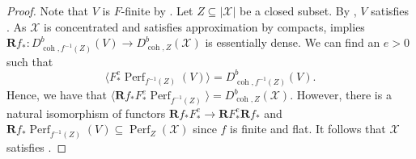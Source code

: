 \documentclass[10pt,a4paper]{amsart}
\begin{document}
\begin{proof}
    Note that $V$ is $F$-finite by . Let $Z\subseteq |\mathcal{X}|$ be a closed subset. 
    By , $V$ satisfies . 
    As $\mathcal{X}$ is concentrated and satisfies approximation by compacts,  implies $\mathbf{R} f_\ast \colon D^b_{\operatorname{coh},f^{-1}(Z)}(V) \to D^b_{\operatorname{coh},Z}(\mathcal{X})$ is essentially dense. 
    We can find an $e>0$ such that 
    \begin{displaymath}
        \langle F_\ast^e \operatorname{Perf}_{f^{-1} (Z)} (V) \rangle = D^b_{\operatorname{coh},f^{-1}(Z)}(V).
    \end{displaymath}
    Hence, we have that $\langle \mathbf{R} f_\ast F_\ast^e \operatorname{Perf}_{f^{-1} (Z)} \rangle = D_{\operatorname{coh},Z}^b(\mathcal{X})$. 
    However, there is a natural isomorphism of functors $\mathbf{R} f_\ast F_\ast^e \to \mathbf{R} F_\ast^e \mathbf{R} f_\ast$ and $\mathbf{R}f_\ast\operatorname{Perf}_{f^{-1} (Z)} (V) \subseteq \operatorname{Perf}_Z(\mathcal{X})$ since $f$ is finite and flat.
    It follows that $\mathcal{X}$ satisfies . 
\end{proof}
\end{document}
